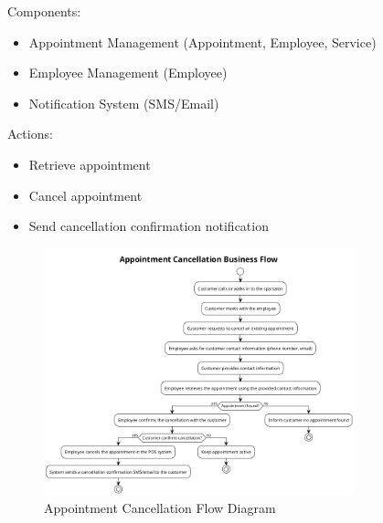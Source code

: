 \documentclass[]{VUMIFTemplateClass}
\begin{document}
Components:
\begin{itemize}
    \setlength{\itemsep}{2pt}
    \setlength{\parskip}{0pt}
    \setlength{\parsep}{0pt}
    \item Appointment Management (Appointment, Employee, Service)
    \item Employee Management (Employee)
    \item Notification System (SMS/Email)
\end{itemize}

Actions:
\begin{itemize}
    \setlength{\itemsep}{2pt}
    \setlength{\parskip}{0pt}
    \setlength{\parsep}{0pt}
    \item Retrieve appointment
    \item Cancel appointment
    \item Send cancellation confirmation notification
\end{itemize}

\begin{figure}[H]
    \centering
    \includegraphics[width=0.8\textwidth]{images/diagrams/services/appointment_cancellation_flow.png}
    \caption{Appointment Cancellation Flow Diagram}
    \label{fig:appointment_cancellation_flow}
\end{figure}
\end{document}
